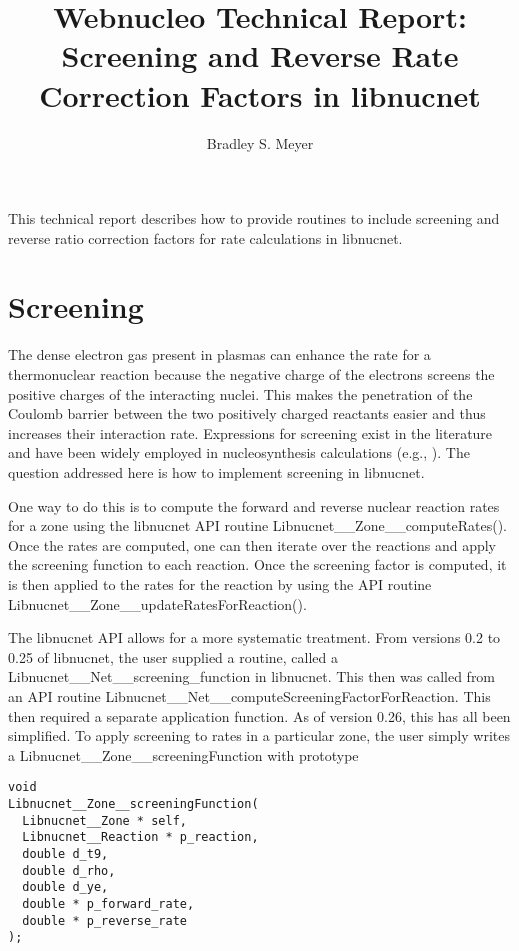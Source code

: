 \documentclass{article}    %
\title{Webnucleo Technical Report: Screening and Reverse Rate Correction
Factors in libnucnet}  %
\author{Bradley S. Meyer}
\begin{document}

\maketitle                 %


This technical report describes how to provide routines to include
screening and reverse ratio correction factors for rate calculations
in libnucnet.

\section{Screening}

The dense electron gas present in plasmas can enhance the rate for a
thermonuclear reaction because the negative charge of the electrons screens
the positive charges of the interacting nuclei.  This makes the penetration
of the Coulomb barrier between the two positively charged reactants easier
and thus increases their interaction rate.
Expressions for screening exist in the literature and have been widely
employed in nucleosynthesis calculations (e.g., \cite{1982ApJ...258..696W}).
The question addressed here is how to implement screening in libnucnet.

One way to do this is to compute the forward and reverse nuclear reaction
rates for a zone using the libnucnet API routine
Libnucnet\_\_Zone\_\_computeRates().
Once the rates are computed, one can
then iterate over the reactions and apply the screening function to each
reaction.  Once the screening factor is computed, it is then applied to
the rates for the reaction by using the API routine
Libnucnet\_\_Zone\_\_updateRatesForReaction().

The libnucnet API allows for a more systematic treatment.
From versions 0.2 to 0.25 of libnucnet, the user supplied a routine,
called a Libnucnet\_\_Net\_\_screening\_function in libnucnet.  This then
was called from an API routine
Libnucnet\_\_Net\_\_computeScreeningFactorForReaction.  This then
required a separate application function.  As of version 0.26, this
has all been simplified.  To apply screening to rates in a particular
zone, the user simply writes a
Libnucnet\_\_Zone\_\_screeningFunction with prototype
\begin{verbatim}
void
Libnucnet__Zone__screeningFunction(
  Libnucnet__Zone * self,
  Libnucnet__Reaction * p_reaction,
  double d_t9,
  double d_rho,
  double d_ye,
  double * p_forward_rate,
  double * p_reverse_rate
);
\end{verbatim}
\end{document}
